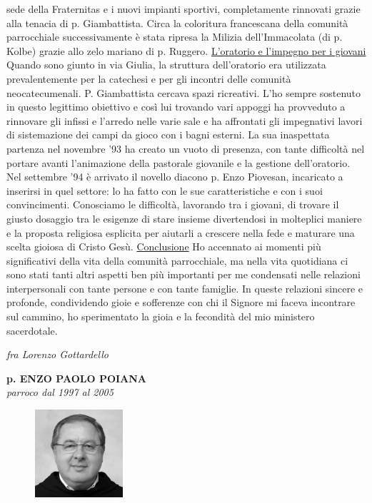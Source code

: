 sede della Fraternitas e i nuovi impianti sportivi, completamente rinnovati grazie alla tenacia di p. 
Giambattista. 
Circa la coloritura francescana della comunità parrocchiale successivamente è stata ripresa la 
Milizia dell’Immacolata (di p. Kolbe) grazie allo zelo mariano di p. Ruggero. 
\bigbreak
{}
\underline{L'oratorio e l'impegno per i giovani}
\medbreak
Quando sono giunto in via Giulia, la struttura dell'oratorio era utilizzata prevalentemente per 
la catechesi e per gli incontri delle comunità neocatecumenali. P. Giambattista cercava spazi 
ricreativi. L'ho sempre sostenuto in questo legittimo obiettivo e così lui trovando vari appoggi ha 
provveduto a rinnovare gli infissi e l'arredo nelle varie sale e ha affrontati gli impegnativi lavori di 
sistemazione dei campi da gioco con i bagni esterni.
La sua inaspettata partenza nel novembre '93 ha creato un vuoto di presenza, con tante 
difficoltà nel portare avanti l'animazione della pastorale giovanile e la gestione dell'oratorio.
Nel settembre '94 è arrivato il novello diacono p. Enzo Piovesan, incaricato a inserirsi in quel 
settore: lo ha fatto con le sue caratteristiche e con i suoi convincimenti. Conosciamo le difficoltà, 
lavorando tra i giovani, di trovare il giusto dosaggio tra le esigenze di stare insieme divertendosi in 
molteplici maniere e la proposta religiosa esplicita per aiutarli a crescere nella fede e maturare una 
scelta gioiosa di Cristo Gesù.
\bigbreak
{}
\underline{Conclusione}
\medbreak
Ho accennato ai momenti più significativi della vita della comunità parrocchiale, ma nella 
vita quotidiana ci sono stati tanti altri aspetti ben più importanti per me condensati nelle relazioni 
interpersonali con tante persone e con tante famiglie. In queste relazioni sincere e profonde, 
condividendo gioie e sofferenze con chi il Signore mi faceva incontrare sul cammino, ho 
sperimentato la gioia e la fecondità del mio ministero sacerdotale. 
\begin{flushright}
\textit{fra Lorenzo Gottardello}
\end{flushright}
\endgroup
\newpage
\begin{center}
\textbf{\Large p. ENZO PAOLO POIANA}\\
	\textit{parroco dal 1997 al 2005}
\end{center}
\bigbreak
\begingroup
\setlength\intextsep{0pt}
\begin{figure}
\centering
\includegraphics[width=0.29\textwidth]{immagini/enzo.jpg}
\end{figure}
